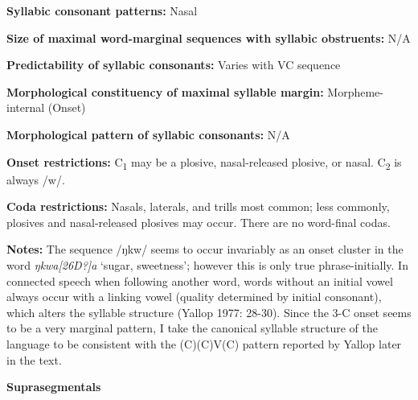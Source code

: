 \begin{styleBody}
\textbf{Syllabic consonant patterns:} Nasal
\end{styleBody}

\begin{styleBody}
\textbf{Size of maximal word{}-marginal sequences with syllabic obstruents:} N/A
\end{styleBody}

\begin{styleBody}
\textbf{Predictability of syllabic consonants:} Varies with VC sequence
\end{styleBody}

\begin{styleBody}
\textbf{Morphological constituency of maximal syllable margin:} Morpheme-internal (Onset)
\end{styleBody}

\begin{styleBody}
\textbf{Morphological pattern of syllabic consonants:} N/A
\end{styleBody}

\begin{styleBody}
\textbf{Onset restrictions:} C\textsubscript{1} may be a plosive, nasal-released plosive, or nasal. C\textsubscript{2} is always /w/.
\end{styleBody}

\begin{styleBody}
\textbf{Coda restrictions:} Nasals, laterals, and trills most common; less commonly, plosives and nasal-released plosives may occur. There are no word-final codas.
\end{styleBody}

\begin{styleBody}
\textbf{Notes:} The sequence /ŋkw/ seems to occur invariably as an onset cluster in the word \textit{ŋkwa[26D?]a} ‘sugar, sweetness’; however this is only true phrase-initially. In connected speech when following another word, words without an initial vowel always occur with a linking vowel (quality determined by initial consonant), which alters the syllable structure (Yallop 1977: 28-30). Since the 3-C onset seems to be a very marginal pattern, I take the canonical syllable structure of the language to be consistent with the (C)(C)V(C) pattern reported by Yallop later in the text.
\end{styleBody}

\begin{styleBody}
\textbf{Suprasegmentals}
\end{styleBody}

